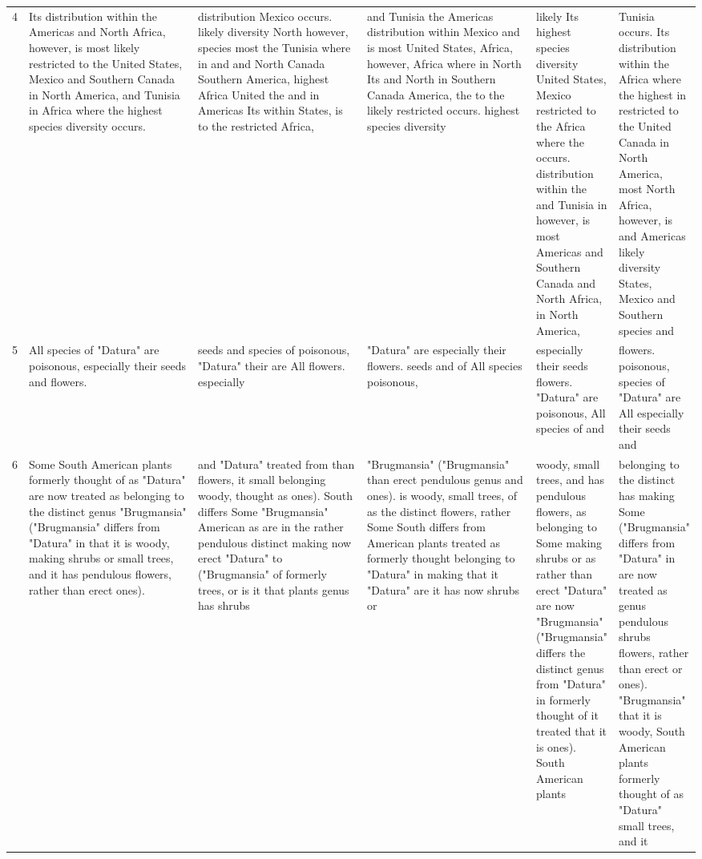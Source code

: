 \begin{table*}[]
{\begin{tabular}{|l|p{0.3\linewidth}|p{0.3\linewidth}|p{0.3\linewidth}|p{0.3\linewidth}|p{0.3\linewidth}|}
4 & Its distribution within the Americas and North Africa, however, is most likely restricted to the United States, Mexico and Southern Canada in North America, and Tunisia in Africa where the highest species diversity occurs. & distribution Mexico occurs. likely diversity North however, species most the Tunisia where in and and North Canada Southern America, highest Africa United the and in Americas Its within States, is to the restricted Africa, & and Tunisia the Americas distribution within Mexico and is most United States, Africa, however, Africa where in North Its and North in Southern Canada America, the to the likely restricted occurs. highest species diversity & likely Its highest species diversity United States, Mexico restricted to the Africa where the occurs. distribution within the and Tunisia in however, is most Americas and Southern Canada and North Africa, in North America, & Tunisia occurs. Its distribution within the Africa where the highest in restricted to the United Canada in North America, most North Africa, however, is and Americas likely diversity States, Mexico and Southern species and \\
5 & All species of "Datura" are poisonous, especially their seeds and flowers. & seeds and species of poisonous, "Datura" their are All flowers. especially & "Datura" are especially their flowers. seeds and of All species poisonous, & especially their seeds flowers. "Datura" are poisonous, All species of and & flowers. poisonous, species of "Datura" are All especially their seeds and \\
6 & Some South American plants formerly thought of as "Datura" are now treated as belonging to the distinct genus "Brugmansia" ("Brugmansia" differs from "Datura" in that it is woody, making shrubs or small trees, and it has pendulous flowers, rather than erect ones). & and "Datura" treated from than flowers, it small belonging woody, thought as ones). South differs Some "Brugmansia" American as are in the rather pendulous distinct making now erect "Datura" to ("Brugmansia" of formerly trees, or is it that plants genus has shrubs & "Brugmansia" ("Brugmansia" than erect pendulous genus and ones). is woody, small trees, of as the distinct flowers, rather Some South differs from American plants treated as formerly thought belonging to "Datura" in making that it "Datura" are it has now shrubs or & woody, small trees, and has pendulous flowers, as belonging to Some making shrubs or as rather than erect "Datura" are now "Brugmansia" ("Brugmansia" differs the distinct genus from "Datura" in formerly thought of it treated that it is ones). South American plants & belonging to the distinct has making Some ("Brugmansia" differs from "Datura" in are now treated as genus pendulous shrubs flowers, rather than erect or ones). "Brugmansia" that it is woody, South American plants formerly thought of as "Datura" small trees, and it \\

\end{tabular}}
\end{table*}
